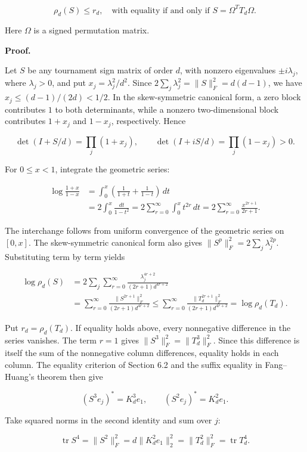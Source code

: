 \documentclass[11pt,a4paper]{article}
\begin{document}
\[
\rho_d(S)\le r_d,
\quad\text{with equality if and only if }S=\Omega^TT_d\Omega.
\]

Here \(\Omega\) is a signed permutation matrix.

\textbf{Proof.}

Let \(S\) be any tournament sign matrix of order \(d\), with nonzero eigenvalues \(\pm i\lambda_j\), where \(\lambda_j>0\), and put \(x_j=\lambda_j^2/d^2\). Since \(2\sum_j\lambda_j^2=\|S\|_F^2=d(d-1)\), we have \(x_j\le(d-1)/(2d)<1/2\). In the skew-symmetric canonical form, a zero block contributes \(1\) to both determinants, while a nonzero two-dimensional block contributes \(1+x_j\) and \(1-x_j\), respectively. Hence

\[
\det(I+S/d)=\prod_j(1+x_j),\qquad
\det(I+iS/d)=\prod_j(1-x_j)>0.
\]

For \(0\le x<1\), integrate the geometric series:

\[
\begin{aligned}
\log\frac{1+x}{1-x}
&=\int_0^x\left(\frac1{1+t}+\frac1{1-t}\right)\,dt\\
&=2\int_0^x\frac{dt}{1-t^2}
=2\sum_{r=0}^\infty\int_0^x t^{2r}\,dt
=2\sum_{r=0}^\infty\frac{x^{2r+1}}{2r+1}.
\end{aligned}
\]

The interchange follows from uniform convergence of the geometric series on \([0,x]\). The skew-symmetric canonical form also gives \(\|S^p\|_F^2=2\sum_j\lambda_j^{2p}\). Substituting term by term yields

\[
\begin{aligned}
\log\rho_d(S)
&=2\sum_j\sum_{r=0}^\infty
\frac{\lambda_j^{4r+2}}{(2r+1)d^{4r+2}}\\
&=\sum_{r=0}^\infty
\frac{\|S^{2r+1}\|_F^2}{(2r+1)d^{4r+2}}
\le\sum_{r=0}^\infty
\frac{\|T_d^{2r+1}\|_F^2}{(2r+1)d^{4r+2}}
=\log\rho_d(T_d).
\end{aligned}
\]

Put \(r_d=\rho_d(T_d)\). If equality holds above, every nonnegative difference in the series vanishes. The term \(r=1\) gives \(\|S^3\|_F^2=\|T_d^3\|_F^2\). Since this difference is itself the sum of the nonnegative column differences, equality holds in each column. The equality criterion of Section 6.2 and the suffix equality in Fang--Huang's theorem then give

\[
(S^3e_j)^*=K_d^3e_1,\qquad
(S^2e_j)^*=K_d^2e_1.
\]

Take squared norms in the second identity and sum over \(j\):

\[
\operatorname{tr}S^4=\|S^2\|_F^2
=d\|K_d^2e_1\|_2^2
=\|T_d^2\|_F^2=\operatorname{tr}T_d^4.
\]
\end{document}
